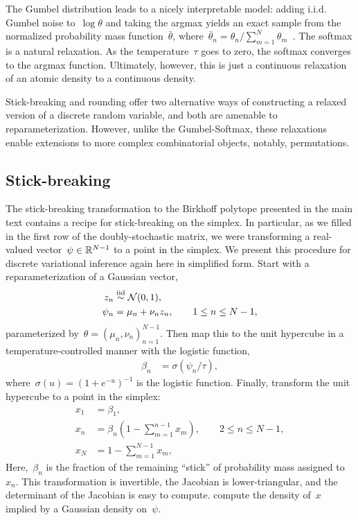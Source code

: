 The Gumbel distribution leads to a nicely interpretable model: adding
i.i.d. Gumbel noise to~${\log \theta}$ and taking the argmax yields an
exact sample from the normalized probability mass
function~$\bar{\theta}$,
where~${\bar{\theta}_n = \theta_n / \sum_{m=1}^N
  \theta_m}$~\citep{gumbel1954statistical}. The softmax is a natural
relaxation. As the temperature~$\tau$ goes to zero, the softmax
converges to the argmax function. Ultimately, however, this is just a
continuous relaxation of an atomic density to a continuous density.

Stick-breaking and rounding offer two alternative ways of constructing a
relaxed version of a discrete random variable, and both are amenable
to reparameterization. However, unlike the Gumbel-Softmax, these
relaxations enable extensions to more complex combinatorial objects,
notably, permutations.

\subsection{Stick-breaking}

The stick-breaking transformation to the Birkhoff polytope presented
in the main text contains a recipe for stick-breaking on the simplex.
In particular, as we filled in the first row of the doubly-stochastic
matrix, we were transforming a real-valued vector~$\psi \in \mathbb{R}^{N-1}$
to a point in the simplex.  We present this procedure for
discrete variational inference again here in simplified form.
Start with a reparameterization of a Gaussian vector,
\begin{align*}
  z_n &\stackrel{\text{iid}}{\sim} \mathcal{N}(0, 1), \\
  \psi_n & = \mu_n + \nu_n z_n, \qquad 1 \leq n \leq N-1,
\end{align*}
parameterized by~${\theta = (\mu_n, \nu_n)_{n=1}^{N-1}}$. 
Then map this to the unit hypercube in a temperature-controlled manner
with the logistic function,
\begin{align*}
  \beta_n &= \sigma(\psi_n / \tau),
\end{align*}
where~${\sigma(u) = (1+e^{-u})^{-1}}$ is the logistic function.
Finally, transform the unit hypercube to a point in the simplex:
\begin{align*}
  x_1 &= \beta_1, \\
  x_n &= \beta_n \left(1- \sum_{m=1}^{n-1} x_m\right), \qquad 2 \leq n \leq N-1,  \\
  x_N &= 1- \sum_{m=1}^{N-1} x_m,
\end{align*}
Here,~$\beta_n$ is the fraction of the remaining ``stick'' of probability
mass assigned to~$x_n$.  This transformation is invertible, the
Jacobian is lower-triangular, and the determinant of the Jacobian is
easy to compute.  \citet{linderman2015dependent} compute the density
of~$x$ implied by a Gaussian density on~$\psi$.

